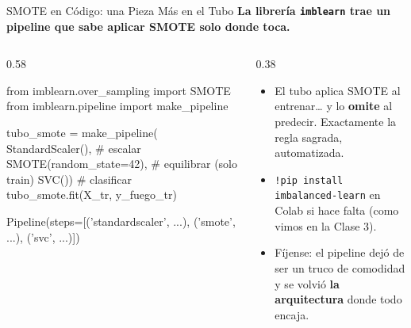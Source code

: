 \documentclass[aspectratio=169, 11pt]{beamer}
\begin{document}
\begin{frame}[fragile,shrink=26]{SMOTE en Código: una Pieza Más en el Tubo}
  \vspace{-4pt}
  {\small\color{arcaDark}\bfseries
    La librería \texttt{imblearn} trae un pipeline que sabe aplicar SMOTE solo donde toca.}

  \vspace{4pt}
  \begin{columns}[T]
    \begin{column}{0.58\textwidth}
      \begin{pyblock}
from imblearn.over_sampling import SMOTE
from imblearn.pipeline import make_pipeline

tubo_smote = make_pipeline(
    StandardScaler(),        # escalar
    SMOTE(random_state=42),  # equilibrar (solo train)
    SVC())                   # clasificar
tubo_smote.fit(X_tr, y_fuego_tr)
      \end{pyblock}
      \vspace{2pt}
      \begin{outputblock}
Pipeline(steps=[('standardscaler', ...),
                ('smote', ...), ('svc', ...)])
      \end{outputblock}
    \end{column}
    \begin{column}{0.38\textwidth}
      {\scriptsize\color{textMuted}
      \begin{itemize}\setlength{\itemsep}{5pt}
        \item[{\color{codeGreen}\scriptsize\faCheck}]
          El tubo aplica SMOTE al entrenar\ldots{} y lo
          \textbf{omite} al predecir. Exactamente la regla
          sagrada, automatizada.
        \item[{\color{arcaRed}\scriptsize\faArrowRight}]
          \texttt{!pip install imbalanced-learn}
          en Colab si hace falta (como vimos en la Clase 3).
        \item[{\color{arcaRed}\scriptsize\faLightbulb[regular]}]
          Fíjense: el pipeline dejó de ser un truco de
          comodidad y se volvió \textbf{la arquitectura} donde
          todo encaja.
      \end{itemize}
      }
    \end{column}
  \end{columns}
\end{frame}
\end{document}
